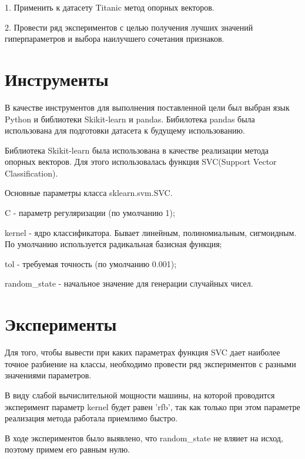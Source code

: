 \documentclass[a4paper,12pt]{article}
\begin{document}
	\vspace{0.5cm}
	1. Применить к датасету Titanic метод опорных векторов.
	
	\vspace{0.5cm}
	2. Провести ряд экспериментов с целью получения лучших значений гиперпараметров и выбора наилучшего сочетания признаков.
	
\newpage\section{Инструменты} 
	В качестве инструментов для выполнения поставленной цели был выбран язык Python и библиотеки Skikit-learn и pandas.
	Бибилотека pandas была использована для подготовки датасета к будущему использованию.
	
	\vspace{0.5cm}
	Библиотека Skikit-learn была использована  в качестве реализации метода опорных векторов. Для этого использовалась функция SVC(Support Vector Classification).  
	
	\vspace{0.5cm}
	Основные параметры класса sklearn.svm.SVC.
	
	\vspace{0.5cm}
	C - параметр регуляризации (по умолчанию 1);
	
	\vspace{0.5cm}
	kernel - ядро классификатора. Бывает линейным, полиномиальным, сигмоидным. По умолчанию используется радикальная базисная функция;
	
	\vspace{0.5cm}
	tol - требуемая точность (по умолчанию 0.001);
	
	
	\vspace{0.5cm}
	random\_state - начальное значение для генерации случайных чисел.


	
\newpage\section{Эксперименты}
	Для того, чтобы вывести при каких параметрах функция SVC дает наиболее точное разбиение на классы, необходимо провести ряд экспериментов с разными значениями параметров. 
	
	В виду слабой вычислительной мощности машины, на которой проводится эксперимент параметр  kernel будет равен 'rfb', так как только при этом параметре реализация метода работала приемлимо быстро.
	
	В ходе экспериментов было выявлено, что  random\_state не вляиет на исход, поэтому примем его равным нулю.
	
\end{document}
